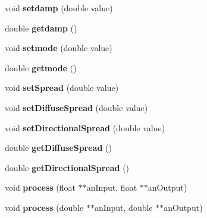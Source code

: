 \begin{DoxyCompactItemize}
\item 
\hypertarget{class_ambisonics_freeverb_a88418211c4cff1db34bc7425b7e04851}{void {\bfseries setdamp} (double value)}\label{class_ambisonics_freeverb_a88418211c4cff1db34bc7425b7e04851}

\item 
\hypertarget{class_ambisonics_freeverb_a6bf23d26b46fac716b9ea5a62c7204b0}{double {\bfseries getdamp} ()}\label{class_ambisonics_freeverb_a6bf23d26b46fac716b9ea5a62c7204b0}

\item 
\hypertarget{class_ambisonics_freeverb_a5a61016ff33520f94217b2a8c7209813}{void {\bfseries setmode} (double value)}\label{class_ambisonics_freeverb_a5a61016ff33520f94217b2a8c7209813}

\item 
\hypertarget{class_ambisonics_freeverb_a791fa2acc21dce0b4049ac67f9c82947}{double {\bfseries getmode} ()}\label{class_ambisonics_freeverb_a791fa2acc21dce0b4049ac67f9c82947}

\item 
\hypertarget{class_ambisonics_freeverb_a22d9662aa37180db98d9a9ba10b2d22f}{void {\bfseries set\-Spread} (double value)}\label{class_ambisonics_freeverb_a22d9662aa37180db98d9a9ba10b2d22f}

\item 
\hypertarget{class_ambisonics_freeverb_a7e2e2c676616ad547186adafec0d6742}{void {\bfseries set\-Diffuse\-Spread} (double value)}\label{class_ambisonics_freeverb_a7e2e2c676616ad547186adafec0d6742}

\item 
\hypertarget{class_ambisonics_freeverb_aa20e7aa4b6b4802a1d077dbd11ebd55b}{void {\bfseries set\-Directional\-Spread} (double value)}\label{class_ambisonics_freeverb_aa20e7aa4b6b4802a1d077dbd11ebd55b}

\item 
\hypertarget{class_ambisonics_freeverb_a1609fa222148fa6212b65fe344e3f106}{double {\bfseries get\-Diffuse\-Spread} ()}\label{class_ambisonics_freeverb_a1609fa222148fa6212b65fe344e3f106}

\item 
\hypertarget{class_ambisonics_freeverb_abe6bb938817b2b3084e7ffc922a86d64}{double {\bfseries get\-Directional\-Spread} ()}\label{class_ambisonics_freeverb_abe6bb938817b2b3084e7ffc922a86d64}

\item 
\hypertarget{class_ambisonics_freeverb_a8e40efc03f9dd21e7a8ae769a0121a79}{void {\bfseries process} (float $\ast$$\ast$an\-Input, float $\ast$$\ast$an\-Output)}\label{class_ambisonics_freeverb_a8e40efc03f9dd21e7a8ae769a0121a79}

\item 
\hypertarget{class_ambisonics_freeverb_a593b3fe14beb34036a825eaa1f053b15}{void {\bfseries process} (double $\ast$$\ast$an\-Input, double $\ast$$\ast$an\-Output)}\label{class_ambisonics_freeverb_a593b3fe14beb34036a825eaa1f053b15}

\end{DoxyCompactItemize}
